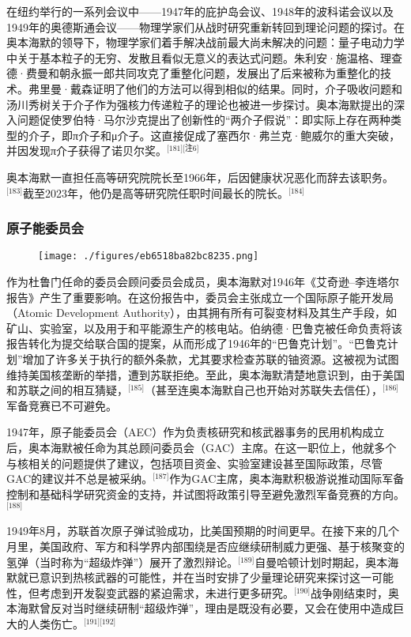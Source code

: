 在纽约举行的一系列会议中——1947年的庇护岛会议、1948年的波科诺会议以及1949年的奥德斯通会议——物理学家们从战时研究重新转回到理论问题的探讨。在奥本海默的领导下，物理学家们着手解决战前最大尚未解决的问题：量子电动力学中关于基本粒子的无穷、发散且看似无意义的表达式问题。朱利安·施温格、理查德·费曼和朝永振一郎共同攻克了重整化问题，发展出了后来被称为重整化的技术。弗里曼·戴森证明了他们的方法可以得到相似的结果。同时，介子吸收问题和汤川秀树关于介子作为强核力传递粒子的理论也被进一步探讨。奥本海默提出的深入问题促使罗伯特·马尔沙克提出了创新性的“两介子假说”：即实际上存在两种类型的介子，即π介子和μ介子。这直接促成了塞西尔·弗兰克·鲍威尔的重大突破，并因发现π介子获得了诺贝尔奖。\(^\text{[181][注6]}\)

奥本海默一直担任高等研究院院长至1966年，后因健康状况恶化而辞去该职务。\(^\text{[183]}\)截至2023年，他仍是高等研究院任职时间最长的院长。\(^\text{[184]}\)
\subsubsection{原子能委员会}
\begin{figure}[ht]
\centering
\texttt{[image: ./figures/eb6518ba82bc8235.png]}
\caption{} \label{fig_ABHM_10}
\end{figure}
作为杜鲁门任命的委员会顾问委员会成员，奥本海默对1946年《艾奇逊–李连塔尔报告》产生了重要影响。在这份报告中，委员会主张成立一个国际原子能开发局（Atomic Development Authority），由其拥有所有可裂变材料及其生产手段，如矿山、实验室，以及用于和平能源生产的核电站。伯纳德·巴鲁克被任命负责将该报告转化为提交给联合国的提案，从而形成了1946年的“巴鲁克计划”。“巴鲁克计划”增加了许多关于执行的额外条款，尤其要求检查苏联的铀资源。这被视为试图维持美国核垄断的举措，遭到苏联拒绝。至此，奥本海默清楚地意识到，由于美国和苏联之间的相互猜疑，\(^\text{[185]}\)（甚至连奥本海默自己也开始对苏联失去信任），\(^\text{[186]}\)军备竞赛已不可避免。

1947年，原子能委员会（AEC）作为负责核研究和核武器事务的民用机构成立后，奥本海默被任命为其总顾问委员会（GAC）主席。在这一职位上，他就多个与核相关的问题提供了建议，包括项目资金、实验室建设甚至国际政策，尽管GAC的建议并不总是被采纳。\(^\text{[187]}\)作为GAC主席，奥本海默积极游说推动国际军备控制和基础科学研究资金的支持，并试图将政策引导至避免激烈军备竞赛的方向。\(^\text{[188]}\)

1949年8月，苏联首次原子弹试验成功，比美国预期的时间更早。在接下来的几个月里，美国政府、军方和科学界内部围绕是否应继续研制威力更强、基于核聚变的氢弹（当时称为“超级炸弹”）展开了激烈辩论。\(^\text{[189]}\)自曼哈顿计划时期起，奥本海默就已意识到热核武器的可能性，并在当时安排了少量理论研究来探讨这一可能性，但考虑到开发裂变武器的紧迫需求，未进行更多研究。\(^\text{[190]}\)战争刚结束时，奥本海默曾反对当时继续研制“超级炸弹”，理由是既没有必要，又会在使用中造成巨大的人类伤亡。\(^\text{[191][192]}\)

